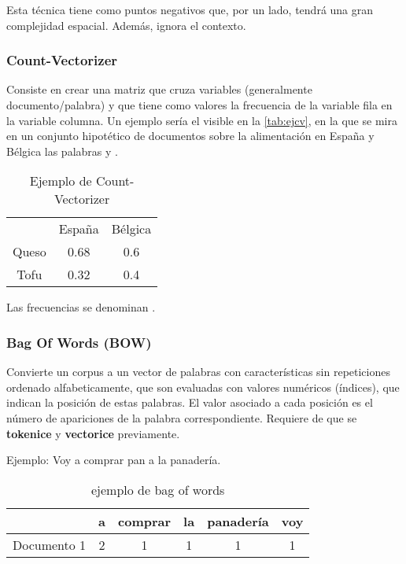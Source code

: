 \documentclass{report}
\begin{document}
Esta técnica tiene como puntos negativos que, por un lado, tendrá una gran complejidad espacial. Además, ignora el contexto.

\subsubsection{Count-Vectorizer}
Consiste en crear una matriz que cruza variables (generalmente documento/palabra) y que tiene como valores la frecuencia de la variable fila en la variable columna.
Un ejemplo sería el visible en la \autoref{tab:ejcv}, en la que se mira en un conjunto hipotético de documentos sobre la alimentación en España y Bélgica las palabras  y .

\begin{table}[ht]
    \centering
    \begin{tabular}{ccc}
         & España & Bélgica \\
        Queso & 0.68 & 0.6 \\
        Tofu  & 0.32 & 0.4 \\
    \end{tabular}
    \caption{Ejemplo de Count-Vectorizer}
    \label{tab:ejcv}
\end{table}

Las frecuencias se denominan .

\subsubsection{Bag Of Words (BOW)}
Convierte un corpus a un vector de palabras con características sin repeticiones ordenado alfabeticamente, que son evaluadas con valores numéricos (índices), que indican la posición de estas palabras.
El valor asociado a cada posición es el número de apariciones de la palabra correspondiente.
Requiere de que se \textbf{tokenice} y \textbf{vectorice} previamente.

Ejemplo:
Voy a comprar pan a la  panadería.

\begin{table}[ht]
    \centering
    \begin{tabular}{ |c|ccccc|}
    \hline
                    & a & comprar & la & panadería & voy \\
    \hline
        Documento 1 & 2 & 1       & 1  & 1         & 1 \\
    \hline
    \end{tabular}
    \caption{ejemplo de bag of words}
    \label{tab:bow}
\end{table}
\end{document}
